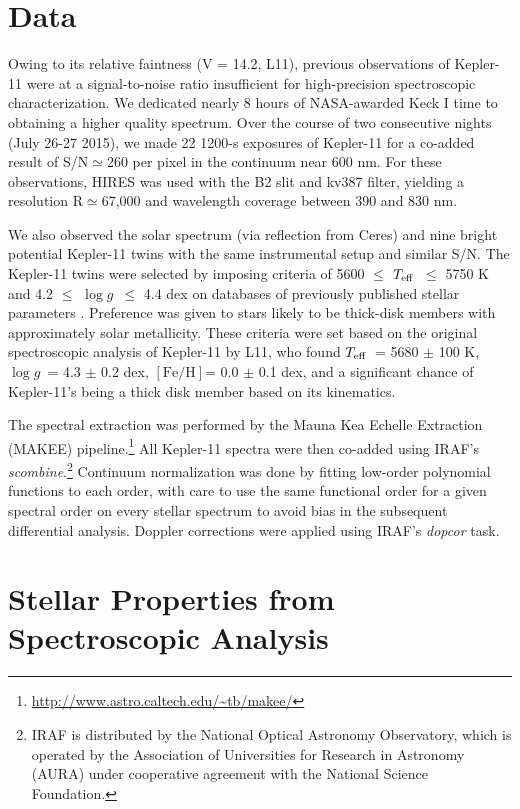 \documentclass[twocolumn,trackchanges]{aastex61}
\newcommand{\teff}{$T_{\rm eff}$}
\newcommand{\logg}{$\log g$}
\newcommand{\feh}{$\mathrm{[Fe/H]}$}
\begin{document}
\section{Data}
\label{s:data}


Owing to its relative faintness (V = 14.2, L11), previous observations of Kepler-11 were at a signal-to-noise ratio insufficient for high-precision spectroscopic characterization. We dedicated nearly 8 hours of NASA-awarded Keck I time to obtaining a higher quality spectrum. Over the course of two consecutive nights (July 26-27 2015), we made 22 1200-s exposures of Kepler-11 for a co-added result of S/N$\simeq$260 per pixel in the continuum near 600 nm. For these observations, HIRES was used with the B2 slit and kv387 filter, yielding a resolution R$\simeq$67,000 and wavelength coverage between 390 and 830 nm.

We also observed the solar spectrum (via reflection from Ceres) and nine bright potential Kepler-11 twins with the same instrumental setup and similar S/N. The Kepler-11 twins were selected by imposing criteria of 5600 $\leq$ \teff\ $\leq$ 5750 K and 4.2 $\leq$ \logg\ $\leq$ 4.4 dex on databases of previously published stellar parameters \citep{Adibekyan2012, Bensby2014}. Preference was given to stars likely to be thick-disk members with approximately solar metallicity. These criteria were set based on the original spectroscopic analysis of Kepler-11 by L11, who found \teff\ = 5680 $\pm$ 100 K, \logg\ = 4.3 $\pm$ 0.2 dex, \feh = 0.0 $\pm$ 0.1 dex, and a significant chance of Kepler-11's being a thick disk member based on its kinematics.

The spectral extraction was performed by the Mauna Kea Echelle Extraction (MAKEE) pipeline.\footnote{\url{
http://www.astro.caltech.edu/~tb/makee/}} All Kepler-11 spectra were then co-added using IRAF's \textit{scombine}.\footnote{IRAF is distributed by the National Optical Astronomy Observatory, which is operated by the Association of Universities for Research in Astronomy (AURA) under cooperative agreement with the National Science Foundation.} Continuum normalization was done by fitting low-order polynomial functions to each order, with care to use the same functional order for a given spectral order on every stellar spectrum to avoid bias in the subsequent differential analysis. Doppler corrections were applied using IRAF's \textit{dopcor} task.



\section{Stellar Properties from Spectroscopic Analysis}
\label{s:characterization}
\end{document}
